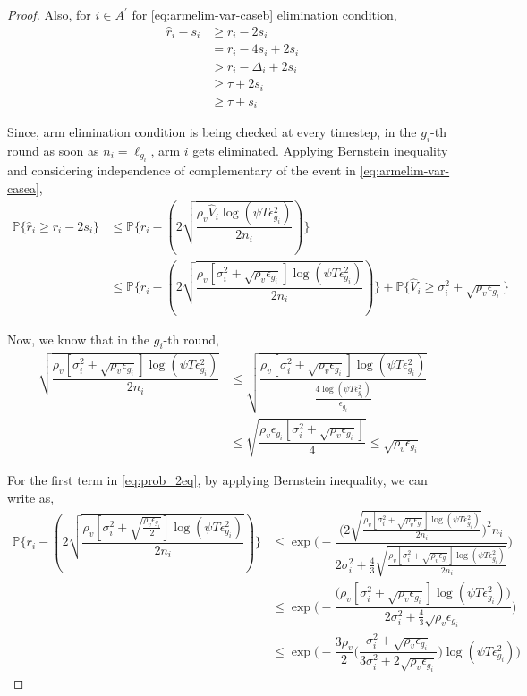 \begin{proof}
Also, for ${i} \in A^{'}$ for \ref{eq:armelim-var-caseb} elimination condition, 
\begin{align*}
\hat{r}_{i} - s_{i}&\geq r_{i} - 2s_{i} \\
&= r_{i} - 4s_{i} + 2s_{i} \\
&> r_{i} - \Delta_{i} + 2s_{i}\\
&\geq \tau + 2s_{i} \\
&\geq \tau + s_{i}
\end{align*}

Since, arm elimination condition is being checked at every timestep, in the $g_{i}$-th round as soon as $n_{i}=\ell_{g_{i}}$, arm $i$ gets eliminated. Applying Bernstein inequality and considering independence of complementary of the event in \ref{eq:armelim-var-casea},
  \begin{align}
\mathbb{P}\lbrace\hat{r}_{i}\geq r_{i} - 2s_{i}\rbrace &\leq \mathbb{P}\bigg\lbrace r_{i}- ( 2\sqrt{\dfrac{\rho_v \hat{V}_{i}\log(\psi T\epsilon_{g_{i}}^{2})}{2n_{i}}}) \bigg\rbrace\\
&\leq \mathbb{P}\bigg\lbrace r_{i}- (2\sqrt{\dfrac{\rho_v [\sigma_{i}^{2}+\sqrt{\rho_{v}\epsilon_{g_{i}}}]\log(\psi T\epsilon_{g_{i}}^{2})}{2n_{i}}})\bigg\rbrace + \mathbb{P}\bigg\lbrace \hat{V}_{i}\geq \sigma_{i}^{2}+\sqrt{\rho_{v}\epsilon_{g_{i}}}\bigg\rbrace \label{eq:prob_2eq}
 \end{align}
 
Now, we know that in the $g_{i}$-th round,
\begin{align*}
\sqrt{\dfrac{\rho_v [\sigma_{i}^{2}+\sqrt{\rho_{v}\epsilon_{g_{i}}}]\log(\psi T\epsilon_{g_{i}}^{2})}{2n_{i}}} &\leq \sqrt{\dfrac{\rho_v [\sigma_{i}^{2}+\sqrt{\rho_{v}\epsilon_{g_{i}}}]\log(\psi T\epsilon_{g_{i}}^{2})}{\frac{4\log(\psi T \epsilon_{g_{i}}^{2})}{\epsilon_{g_{i}}}}}\\
& \leq \sqrt{\dfrac{\rho_v \epsilon_{g_{i}}[\sigma_{i}^{2}+\sqrt{\rho_{v}\epsilon_{g_{i}}}]}{4}}\leq \sqrt{\rho_v \epsilon_{g_{i}}}
\end{align*}

For the first term in \ref{eq:prob_2eq}, by applying Bernstein inequality, we can write as,
 \begin{align*}
\mathbb{P}\bigg\lbrace r_{i}- (2\sqrt{\dfrac{\rho_v [\sigma_{i}^{2}+\sqrt{\frac{\rho_{v}\epsilon_{g_{i}}}{2}}]\log(\psi T\epsilon_{g_{i}}^{2})}{2n_{i}}})\bigg\rbrace &\leq \exp\bigg(- \dfrac{\bigg(2\sqrt{\frac{\rho_v [\sigma_{i}^{2}+\sqrt{\rho_{v}\epsilon_{g_{i}}}]\log(\psi T\epsilon_{g_{i}}^{2})}{2n_{i}}}\bigg)^{2}n_{i}}{2\sigma_{i}^{2}+\frac{4}{3}\sqrt{\frac{\rho_v [\sigma_{i}^{2}+\sqrt{\rho_{v}\epsilon_{g_{i}}}]\log(\psi T\epsilon_{g_{i}}^{2})}{2n_{i}}}}\bigg) \\
&\leq \exp\bigg(- \dfrac{\bigg(\rho_v [\sigma_{i}^{2}+\sqrt{\rho_{v}\epsilon_{g_{i}}}]\log(\psi T\epsilon_{g_{i}}^{2})\bigg)}{2\sigma_{i}^{2}+\frac{4}{3}\sqrt{\rho_v \epsilon_{g_{i}}}} \bigg)\\
&\leq \exp\bigg(- \dfrac{3\rho_v}{2} \bigg(\dfrac{\sigma_{i}^{2}+\sqrt{\rho_{v}\epsilon_{g_{i}}}}{3\sigma_{i}^{2}+2\sqrt{\rho_v \epsilon_{g_{i}}}}\bigg) \log(\psi T\epsilon_{g_{i}}^{2}) \bigg) 
  \end{align*}
  

\end{proof}
